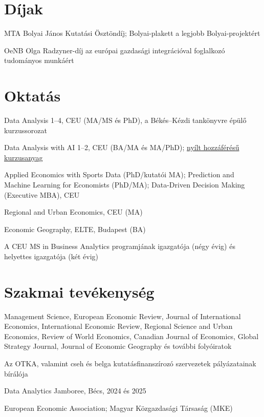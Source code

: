 \documentclass[10pt,a4paper]{article}
\begin{document}
\section{Díjak}
\begin{cvlist}
  \item[2013--2016] MTA Bolyai János Kutatási Ösztöndíj; Bolyai-plakett a legjobb Bolyai-projektért
  \item[2008] OeNB Olga Radzyner-díj az európai gazdasági integrációval foglalkozó tudományos munkáért
\end{cvlist}

\section{Oktatás}
\begin{cvlist}
  \item[2013--] Data Analysis 1--4, CEU (MA/MS és PhD), a Békés--Kézdi tankönyvre épülő kurzussorozat
  \item[] Data Analysis with AI 1--2, CEU (BA/MA és MA/PhD); \href{https://gabors-data-analysis.com/ai-course/}{nyílt hozzáférésű kurzusanyag}
  \item[] Applied Economics with Sports Data (PhD/kutatói MA); Prediction and Machine Learning for Economists (PhD/MA); Data-Driven Decision Making (Executive MBA), CEU
  \item[2011--2016] Regional and Urban Economics, CEU (MA)
  \item[2010--2014] Economic Geography, ELTE, Budapest (BA)
  \item[] A CEU MS in Business Analytics programjának igazgatója (négy évig) és helyettes igazgatója (két évig)
\end{cvlist}

\section{Szakmai tevékenység}
\begin{cvlist}
  \item[Bírálat] Management Science, European Economic Review, Journal of International Economics, International Economic Review, Regional Science and Urban Economics, Review of World Economics, Canadian Journal of Economics, Global Strategy Journal, Journal of Economic Geography és további folyóiratok
  \item[Pályázatok] Az OTKA, valamint cseh és belga kutatásfinanszírozó szervezetek pályázatainak bírálója
  \item[Szervezés] Data Analytics Jamboree, Bécs, 2024 és 2025
  \item[Tagság] European Economic Association; Magyar Közgazdasági Társaság (MKE)
\end{cvlist}
\end{document}
